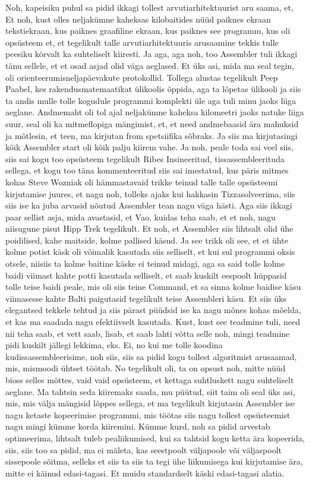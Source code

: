 Noh, kapeisiku puhul sa pidid ikkagi tollest arvutiarhitektuurist aru saama, et,
Et noh, kust olles neljakümne kaheksas kilobaitides nüüd paiknes ekraan tekstiekraan, kus paiknes graafiline ekraan, kus paiknes see programm, kus oli opsüsteem et, et tegelikult talle arvutiarhitektuuris arusaamine tekkis tulle peesiku kõrvalt ka suhteliselt kiiresti.
Ja aga, aga noh, too Assembler tuli ikkagi tänu sellele, et et osad asjad olid väga aeglased. Et üks asi, mida ma seal tegin, oli orienteerumisneljapäevakute protokollid.
Tollega alustas tegelikult Peep Paabel, kes rakendusmatemaatikat ülikoolis õppida, aga ta lõpetas ülikooli ja siis ta andis mulle tolle kogudule programmi komplekti üle aga tuli minu jaoks liiga aeglane. Andmemaht oli tol ajal neljakümne kaheksa kilomeetri jaoks natuke liiga suur, seal oli ka mitmeflopiga mängimist, et, et need andmebaasid ära mahuksid ja mõtlesin, et teen, ma kirjutan from spetsiifika sõbraks. Ja siis ma kirjutasingi kõik Assembler start oli kõik palju kiirem vahe.
Ja noh, peale toda sai veel siis, siis sai kogu too opsüsteem tegelikult Ribes Insineeritud, tissassembleerituda sellega, et kogu too täna kommenteeritud siis sai imestatud, kus päris mitmes kohas Steve Wozniak oli hämmastavaid trikke teinud talle talle opsüsteemi kirjutamise juures, et nagu noh, tolleks ajaks kui hakkasin Tizzasolveerima, siis siis ise ka juba arvasid nõutud Assembler tean nagu väga hästi. Aga siis ikkagi paar sellist asja, mida avastasid, et Vao, kuidas teha saab, et et noh, nagu niisugune pisut Hipp Trek tegelikult. Et noh, et Assembler siis lihtsalt olid ühe poidilised, kahe maitside, kolme pallised käsud.
Ja see trikk oli see, et et ühte kolme potist käsk oli võimalik kasutada siis selliselt, et kui sul programmi oksis otsele, niisiis ta kolme baitine käske ei teinud midagi, aga sa said tolle kolme baidi viimast kahte potti kasutada selliselt, et saab kuskilt eespoolt hüppasid tolle teise baidi peale, mis oli siis teine Command, et sa sinna kolme baidise käsu viimasesse kahte Balti paigutasid tegelikult teise Assembleri käsu.
Et siis üks elegantsed tekkele tehtud ja siis pärast püüdsid ise ka nagu mõnes kohas mõelda, et kas ma saadada nagu efektiivselt kasutada.
Kust, kust see teadmine tuli, need nii teha saab, et vett saab, lisab, et saab lahti võtta selle noh, mingi teadmine pidi kuskilt jällegi lekkima, eks.
Ei, no kui me tolle koodina kudissassembleerisime, noh siis, siis sa pidid kogu tollest algoritmist arusaamad, mis, mismoodi ühtset töötab. No tegelikult oli, ta on opsust noh, mitte nüüd bioss selles mõttes, vaid vaid opsüsteem, et kettaga suhtluskett nagu suhteliselt aeglane. Ma tahtsin seda kiiremaks saada, mu püütud, siit taim oli seal üks asi, mis, mis välja mängisid lõppes sellega, et ma tegelikult kirjutasin Assembler ise nagu ketaste kopeerimise programmi, mis töötas siis nagu tollest opsüsteemist nagu mingi kümme korda kiiremini. Kümme kurd, noh sa pidid arvestab optimeerima, lihtsalt tuleb pealiikumised, kui sa tahtsid kogu ketta ära kopeerida, siis, siis too sa pidid, ma ei mäleta, kas seestpoolt väljapoole või väljaspoolt sissepoole sõitma, selleks et siis ta siis ta tegi ühe liikumisega kui kirjutamise ära, mitte ei käinud edasi-tagasi. Et muidu standardselt käski edasi-tagasi alatia.
